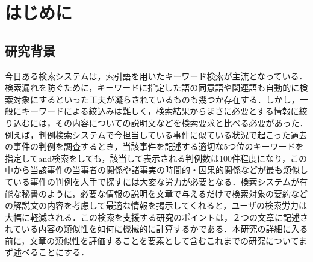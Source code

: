 

\maketitle



\section{はじめに}
\subsection{研究背景}
今日ある検索システムは，索引語を用いたキーワード検索が主流となっている．検索漏れを防ぐために，キーワードに指定した語の同意語や関連語も自動的に検索対象にするといった工夫が凝らされているものも幾つか存在する．しかし，一般にキーワードによる絞込みは難しく，検索結果からまさに必要とする情報に絞り込むには，その内容についての説明文などを検索要求と比べる必要があった．例えば，判例検索システムで今担当している事件に似ている状況で起こった過去の事件の判例を調査するとき，当該事件を記述する適切な5つ位のキーワードを指定してand検索をしても，該当して表示される判例数は100件程度になり，この中から当該事件の当事者の関係や諸事実の時間的・因果的関係などが最も類似している事件の判例を人手で探すには大変な労力が必要となる．検索システムが有能な秘書のように，必要な情報の説明を文章で与えるだけで検索対象の要約などの解説文の内容を考慮して最適な情報を掲示してくれると，ユーザの検索労力は大幅に軽減される．この検索を支援する研究のポイントは，２つの文章に記述されている内容の類似性を如何に機械的に計算するかである．本研究の詳細に入る前に，文章の類似性を評価することを要素として含むこれまでの研究についてまず述べることにする．


